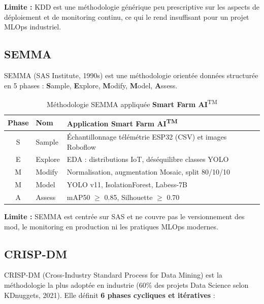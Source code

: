 \documentclass[12pt,a4paper,oneside]{report}
\newcommand{\farmAI}{\textbf{Smart Farm AI}\textsuperscript{TM}}
\begin{document}
\noindent\textbf{Limite :} KDD est une m\'ethodologie g\'en\'erique peu prescriptive sur
les aspects de d\'eploiement et de monitoring continu, ce qui le rend insuffisant pour
un projet MLOps industriel.

\subsection{SEMMA}

SEMMA (SAS Institute, 1990s) est une m\'ethodologie orient\'ee donn\'ees structur\'ee en
5 phases : \textbf{S}ample, \textbf{E}xplore, \textbf{M}odify, \textbf{M}odel,
\textbf{A}ssess.

\begin{table}[H]\centering
\caption{M\'ethodologie SEMMA appliqu\'ee \ \farmAI{}}
\label{tab:semma}
\begin{tabular}{clp{7.5cm}}
\toprule
\textbf{Phase} & \textbf{Nom} & \textbf{Application \farmAI{}} \\
\midrule
S & Sample  & \'Echantillonnage t\'el\'em\'etrie ESP32 (CSV) et images Roboflow \\
E & Explore & EDA : distributions IoT, d\'es\'equilibre classes YOLO \\
M & Modify  & Normalisation, augmentation Mosaic, split 80/10/10 \\
M & Model   & YOLO v11, IsolationForest, Labess-7B \\
A & Assess  & mAP50 $\geq$ 0.85, Silhouette $\geq$ 0.70 \\
\bottomrule
\end{tabular}
\end{table}

\noindent\textbf{Limite :} SEMMA est centr\'ee sur SAS et ne couvre pas le versionnement
des mod\eles, le monitoring en production ni les pratiques MLOps modernes.

\subsection{CRISP-DM}

CRISP-DM (Cross-Industry Standard Process for Data Mining) est la m\'ethodologie
la plus adopt\'ee en industrie (60\% des projets Data Science selon KDnuggets, 2021).
Elle d\'efinit \textbf{6 phases cycliques et it\'eratives} :
\end{document}
